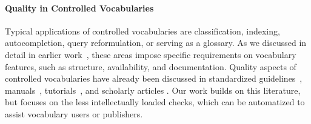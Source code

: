 


\paragraph{Quality in Controlled Vocabularies}

Typical applications of controlled vocabularies are classification, indexing, autocompletion, query reformulation, or serving as a glossary. As we discussed in detail in earlier work~\cite{Nagy2011}, these areas impose specific requirements on vocabulary features, such as structure, availability, and documentation. Quality aspects of controlled vocabularies have already been discussed in standardized guidelines~\cite{ISO25964-1:2011,Z39.19:2005}, manuals~\cite{Svenonius2003,Hedden2010,Aitchison2000,Harpring2010}, tutorials~\cite{Soergel2002}, and scholarly articles \cite{Coronado2009,Soergel1997,Elkin2002,Kless2010}. Our work builds on this literature, but focuses on the less intellectually loaded checks, which can be automatized to assist vocabulary users or publishers. 
